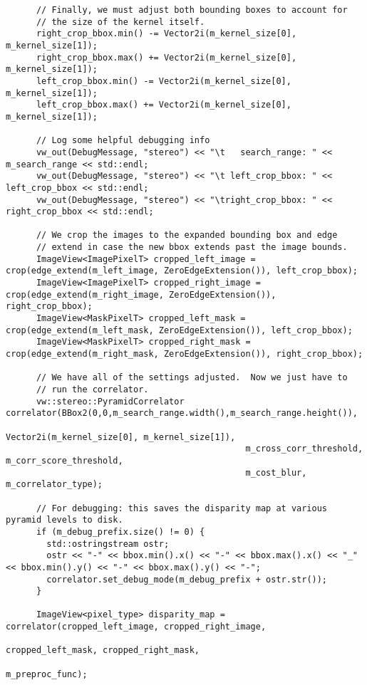 \begin{verbatim}
      // Finally, we must adjust both bounding boxes to account for
      // the size of the kernel itself.
      right_crop_bbox.min() -= Vector2i(m_kernel_size[0], m_kernel_size[1]);
      right_crop_bbox.max() += Vector2i(m_kernel_size[0], m_kernel_size[1]);
      left_crop_bbox.min() -= Vector2i(m_kernel_size[0], m_kernel_size[1]);
      left_crop_bbox.max() += Vector2i(m_kernel_size[0], m_kernel_size[1]);

      // Log some helpful debugging info
      vw_out(DebugMessage, "stereo") << "\t   search_range: " << m_search_range << std::endl;
      vw_out(DebugMessage, "stereo") << "\t left_crop_bbox: " << left_crop_bbox << std::endl;
      vw_out(DebugMessage, "stereo") << "\tright_crop_bbox: " << right_crop_bbox << std::endl;

      // We crop the images to the expanded bounding box and edge
      // extend in case the new bbox extends past the image bounds.
      ImageView<ImagePixelT> cropped_left_image = crop(edge_extend(m_left_image, ZeroEdgeExtension()), left_crop_bbox);
      ImageView<ImagePixelT> cropped_right_image = crop(edge_extend(m_right_image, ZeroEdgeExtension()), right_crop_bbox);
      ImageView<MaskPixelT> cropped_left_mask = crop(edge_extend(m_left_mask, ZeroEdgeExtension()), left_crop_bbox);
      ImageView<MaskPixelT> cropped_right_mask = crop(edge_extend(m_right_mask, ZeroEdgeExtension()), right_crop_bbox);
      
      // We have all of the settings adjusted.  Now we just have to
      // run the correlator.
      vw::stereo::PyramidCorrelator correlator(BBox2(0,0,m_search_range.width(),m_search_range.height()),
                                               Vector2i(m_kernel_size[0], m_kernel_size[1]),
                                               m_cross_corr_threshold, m_corr_score_threshold,
                                               m_cost_blur, m_correlator_type);

      // For debugging: this saves the disparity map at various pyramid levels to disk.
      if (m_debug_prefix.size() != 0) {
        std::ostringstream ostr;
        ostr << "-" << bbox.min().x() << "-" << bbox.max().x() << "_" << bbox.min().y() << "-" << bbox.max().y() << "-";
        correlator.set_debug_mode(m_debug_prefix + ostr.str());
      }
      
      ImageView<pixel_type> disparity_map = correlator(cropped_left_image, cropped_right_image, 
                                                       cropped_left_mask, cropped_right_mask,
                                                       m_preproc_func);
      

\end{verbatim}
